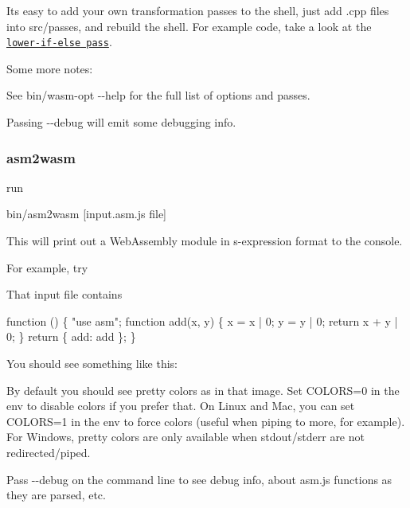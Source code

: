 It\textquotesingle{}s easy to add your own transformation passes to the shell, just add {\ttfamily .cpp} files into {\ttfamily src/passes}, and rebuild the shell. For example code, take a look at the \href{https://github.com/WebAssembly/binaryen/blob/master/src/passes/LowerIfElse.cpp}{\tt {\ttfamily lower-\/if-\/else} pass}.

Some more notes\+:


\begin{DoxyItemize}
\item See {\ttfamily bin/wasm-\/opt -\/-\/help} for the full list of options and passes.
\item Passing {\ttfamily -\/-\/debug} will emit some debugging info.
\end{DoxyItemize}

\subsubsection*{asm2wasm}

run


\begin{DoxyCode}
bin/asm2wasm [input.asm.js file]
\end{DoxyCode}


This will print out a Web\+Assembly module in s-\/expression format to the console.

For example, try




That input file contains


\begin{DoxyCode}
function () \{
  "use asm";
  function add(x, y) \{
    x = x | 0;
    y = y | 0;
    return x + y | 0;
  \}
  return \{ add: add \};
\}
\end{DoxyCode}


You should see something like this\+:



By default you should see pretty colors as in that image. Set {\ttfamily C\+O\+L\+O\+RS=0} in the env to disable colors if you prefer that. On Linux and Mac, you can set {\ttfamily C\+O\+L\+O\+RS=1} in the env to force colors (useful when piping to {\ttfamily more}, for example). For Windows, pretty colors are only available when {\ttfamily stdout/stderr} are not redirected/piped.

Pass {\ttfamily -\/-\/debug} on the command line to see debug info, about asm.\+js functions as they are parsed, etc.

